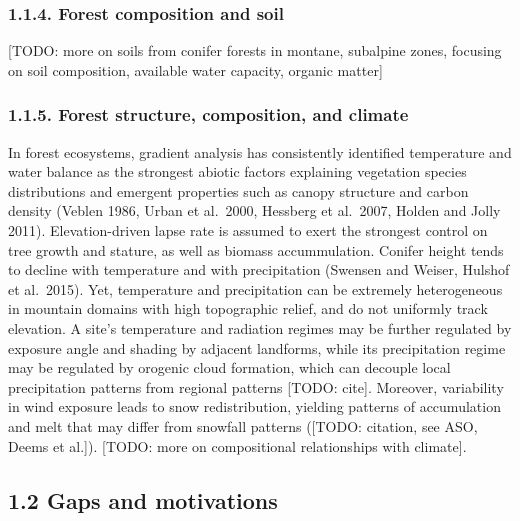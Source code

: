 \documentclass[
  12pt,
]{article}
\begin{document}
\subsubsection{1.1.4. Forest composition and
soil}\label{forest-composition-and-soil}

{[}TODO: more on soils from conifer forests in montane, subalpine zones,
focusing on soil composition, available water capacity, organic
matter{]}

\subsubsection{1.1.5. Forest structure, composition, and
climate}\label{forest-structure-composition-and-climate}

In forest ecosystems, gradient analysis has consistently identified
temperature and water balance as the strongest abiotic factors
explaining vegetation species distributions and emergent properties such
as canopy structure and carbon density (Veblen 1986, Urban et al.~2000,
Hessberg et al.~2007, Holden and Jolly 2011). Elevation-driven lapse
rate is assumed to exert the strongest control on tree growth and
stature, as well as biomass accummulation. Conifer height tends to
decline with temperature and with precipitation (Swensen and Weiser,
Hulshof et al.~2015). Yet, temperature and precipitation can be
extremely heterogeneous in mountain domains with high topographic
relief, and do not uniformly track elevation. A site's temperature and
radiation regimes may be further regulated by exposure angle and shading
by adjacent landforms, while its precipitation regime may be regulated
by orogenic cloud formation, which can decouple local precipitation
patterns from regional patterns {[}TODO: cite{]}. Moreover, variability
in wind exposure leads to snow redistribution, yielding patterns of
accumulation and melt that may differ from snowfall patterns ({[}TODO:
citation, see ASO, Deems et al.{]}). {[}TODO: more on compositional
relationships with climate{]}.

\subsection{1.2 Gaps and motivations}\label{gaps-and-motivations}
\end{document}
